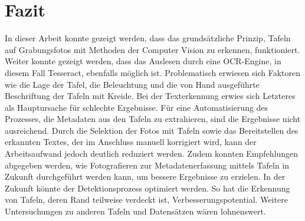 \section{Fazit}

In dieser Arbeit konnte gezeigt werden, dass das grundsätzliche Prinzip, Tafeln auf Grabungsfotos mit Methoden der Computer Vision zu erkennen, funktioniert. Weiter konnte gezeigt werden, dass das Auslesen durch eine OCR-Engine, in diesem Fall Tesseract, ebenfalls möglich ist. Problematisch erwiesen sich Faktoren wie die Lage der Tafel, die Beleuchtung und die von Hand ausgeführte Beschriftung der Tafeln mit Kreide. Bei der Texterkennung erwies sich Letzteres als Hauptursache für schlechte Ergebnisse.
Für eine Automatisierung des Prozesses, die Metadaten aus den Tafeln zu extrahieren, sind die Ergebnisse nicht ausreichend. Durch die Selektion der Fotos mit Tafeln sowie das Bereitstellen des erkannten Textes, der im Anschluss manuell korrigiert wird, kann der Arbeitsaufwand jedoch deutlich reduziert werden. Zudem konnten Empfehlungen abgegeben werden, wie Fotografieren zur Metadatenerfassung mittels Tafeln in Zukunft durchgeführt werden kann, um bessere Ergebnisse zu erzielen.
In der Zukunft könnte der Detektionsprozess optimiert werden. So hat die Erkennung von Tafeln, deren Rand teilweise verdeckt ist, Verbesserungspotential. Weitere Untersuchungen zu anderen Tafeln und Datensätzen wären lohnenswert.